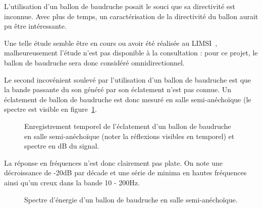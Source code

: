 L'utilisation d'un ballon de baudruche posait le souci que sa directivité est inconnue. Avec plus de temps, un
caractérisation de la directivité du ballon aurait pu être intéressante.

Une telle étude semble être en cours ou avoir été réalisée au LIMSI~\cite{Bru10}, malheureusement l'étude n'est pas
disponible à la consultation : pour ce projet, le ballon de baudruche sera donc considéré omnidirectionnel.

Le second incovénient soulevé par l'utilisation d'un ballon de baudruche est que la bande passante du son généré par
son éclatement n'est pas connue. Un éclatement de ballon de baudruche est donc mesuré en salle semi-anéchoïque (le
spectre est visible en figure~\ref{spk_ballon_anecho}.

\begin{figure}[h!]
\caption{\label{spk_ballon_anecho}Enregistrement temporel de l'éclatement d'un ballon de baudruche en salle
semi-anéchoïque (noter la réflexions visibles en temporel) et spectre en dB du signal.}
\end{figure}

La réponse en fréquences n'est donc clairement pas plate. On note une décroissance de -20dB par décade et une série de
minima en hautes fréquences ainsi qu'un creux dans la bande 10 - 200Hz.

\begin{figure}[h!]
\caption{\label{ballon_energie}Spectre d'énergie d'un ballon de baudruche en salle semi-anéchoïque.}
\end{figure}

